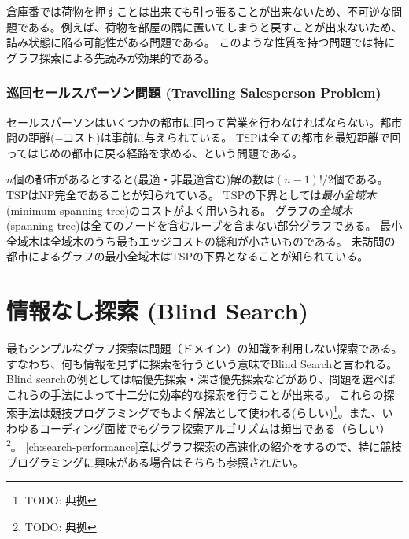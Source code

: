 \documentclass{report}
\begin{document}
倉庫番では荷物を押すことは出来ても引っ張ることが出来ないため、不可逆な問題である。例えば、荷物を部屋の隅に置いてしまうと戻すことが出来ないため、詰み状態に陥る可能性がある問題である。
このような性質を持つ問題では特にグラフ探索による先読みが効果的である。



\subsection{巡回セールスパーソン問題 (Travelling Salesperson Problem)}

セールスパーソンはいくつかの都市に回って営業を行わなければならない。都市間の距離(=コスト)は事前に与えられている。
TSPは全ての都市を最短距離で回ってはじめの都市に戻る経路を求める、という問題である。

$n$個の都市があるとすると(最適・非最適含む)解の数は$(n-1)!/2$個である。
TSPはNP完全であることが知られている。
TSPの下界としては{\it 最小全域木} (minimum spanning tree)のコストがよく用いられる。
グラフの{\it 全域木} (spanning tree)は全てのノードを含むループを含まない部分グラフである。
最小全域木は全域木のうち最もエッジコストの総和が小さいものである。
未訪問の都市によるグラフの最小全域木はTSPの下界となることが知られている。




\chapter{情報なし探索 (Blind Search)}
\label{ch:blind-search}
最もシンプルなグラフ探索は問題（ドメイン）の知識を利用しない探索である。
すなわち、何も情報を見ずに探索を行うという意味でBlind Searchと言われる。
Blind searchの例としては幅優先探索・深さ優先探索などがあり、問題を選べばこれらの手法によって十二分に効率的な探索を行うことが出来る。
これらの探索手法は競技プログラミングでもよく解法として使われる(らしい)\footnote{TODO: 典拠}。また、いわゆるコーディング面接でもグラフ探索アルゴリズムは頻出である（らしい）\footnote{TODO: 典拠}。
\ref{ch:search-performance}章はグラフ探索の高速化の紹介をするので、特に競技プログラミングに興味がある場合はそちらも参照されたい。
\end{document}
